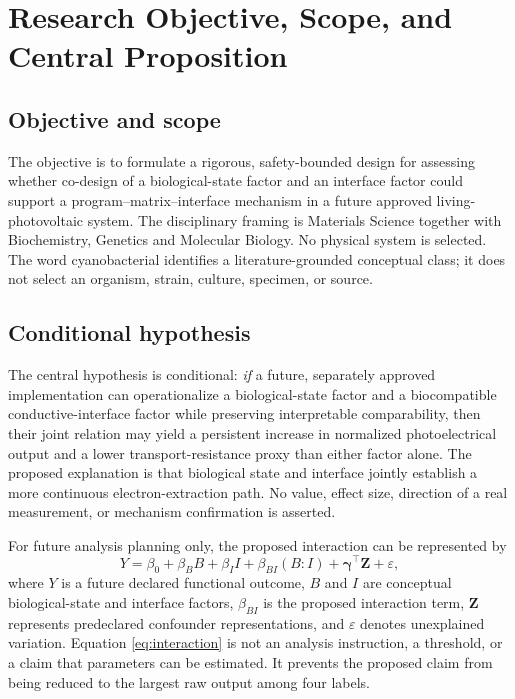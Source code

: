 \documentclass[conference]{IEEEtran}
\begin{document}
\section{Research Objective, Scope, and Central Proposition}

\subsection{Objective and scope}

The objective is to formulate a rigorous, safety-bounded design for assessing whether co-design of a biological-state factor and an interface factor could support a program--matrix--interface mechanism in a future approved living-photovoltaic system. The disciplinary framing is Materials Science together with Biochemistry, Genetics and Molecular Biology. No physical system is selected. The word cyanobacterial identifies a literature-grounded conceptual class; it does not select an organism, strain, culture, specimen, or source.

\subsection{Conditional hypothesis}

The central hypothesis is conditional: \emph{if} a future, separately approved implementation can operationalize a biological-state factor and a biocompatible conductive-interface factor while preserving interpretable comparability, then their joint relation may yield a persistent increase in normalized photoelectrical output and a lower transport-resistance proxy than either factor alone. The proposed explanation is that biological state and interface jointly establish a more continuous electron-extraction path. No value, effect size, direction of a real measurement, or mechanism confirmation is asserted.

For future analysis planning only, the proposed interaction can be represented by
\begin{equation}
  Y = \beta_{0} + \beta_{B}B + \beta_{I}I
  + \beta_{BI}(B\mathbin{:}I) + \boldsymbol{\gamma}^{\top}\mathbf{Z}
  + \varepsilon ,
  \label{eq:interaction}
\end{equation}
where $Y$ is a future declared functional outcome, $B$ and $I$ are conceptual biological-state and interface factors, $\beta_{BI}$ is the proposed interaction term, $\mathbf{Z}$ represents predeclared confounder representations, and $\varepsilon$ denotes unexplained variation. Equation \eqref{eq:interaction} is not an analysis instruction, a threshold, or a claim that parameters can be estimated. It prevents the proposed claim from being reduced to the largest raw output among four labels.
\end{document}
